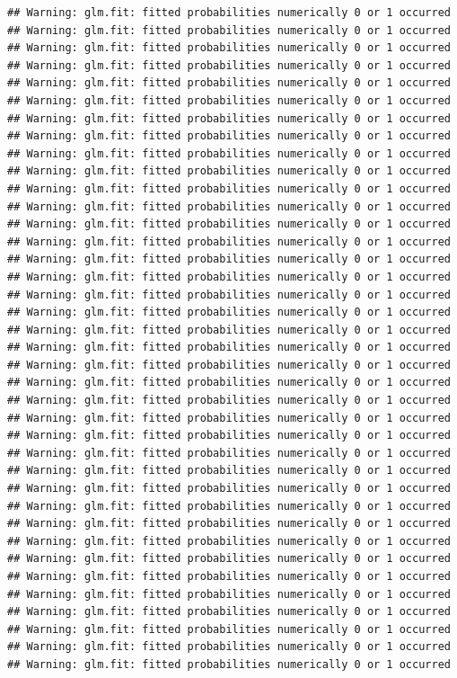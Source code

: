 \documentclass[
]{article}
\begin{document}
\begin{verbatim}
## Warning: glm.fit: fitted probabilities numerically 0 or 1 occurred
## Warning: glm.fit: fitted probabilities numerically 0 or 1 occurred
## Warning: glm.fit: fitted probabilities numerically 0 or 1 occurred
## Warning: glm.fit: fitted probabilities numerically 0 or 1 occurred
## Warning: glm.fit: fitted probabilities numerically 0 or 1 occurred
## Warning: glm.fit: fitted probabilities numerically 0 or 1 occurred
## Warning: glm.fit: fitted probabilities numerically 0 or 1 occurred
## Warning: glm.fit: fitted probabilities numerically 0 or 1 occurred
## Warning: glm.fit: fitted probabilities numerically 0 or 1 occurred
## Warning: glm.fit: fitted probabilities numerically 0 or 1 occurred
## Warning: glm.fit: fitted probabilities numerically 0 or 1 occurred
## Warning: glm.fit: fitted probabilities numerically 0 or 1 occurred
## Warning: glm.fit: fitted probabilities numerically 0 or 1 occurred
## Warning: glm.fit: fitted probabilities numerically 0 or 1 occurred
## Warning: glm.fit: fitted probabilities numerically 0 or 1 occurred
## Warning: glm.fit: fitted probabilities numerically 0 or 1 occurred
## Warning: glm.fit: fitted probabilities numerically 0 or 1 occurred
## Warning: glm.fit: fitted probabilities numerically 0 or 1 occurred
## Warning: glm.fit: fitted probabilities numerically 0 or 1 occurred
## Warning: glm.fit: fitted probabilities numerically 0 or 1 occurred
## Warning: glm.fit: fitted probabilities numerically 0 or 1 occurred
## Warning: glm.fit: fitted probabilities numerically 0 or 1 occurred
## Warning: glm.fit: fitted probabilities numerically 0 or 1 occurred
## Warning: glm.fit: fitted probabilities numerically 0 or 1 occurred
## Warning: glm.fit: fitted probabilities numerically 0 or 1 occurred
## Warning: glm.fit: fitted probabilities numerically 0 or 1 occurred
## Warning: glm.fit: fitted probabilities numerically 0 or 1 occurred
## Warning: glm.fit: fitted probabilities numerically 0 or 1 occurred
## Warning: glm.fit: fitted probabilities numerically 0 or 1 occurred
## Warning: glm.fit: fitted probabilities numerically 0 or 1 occurred
## Warning: glm.fit: fitted probabilities numerically 0 or 1 occurred
## Warning: glm.fit: fitted probabilities numerically 0 or 1 occurred
## Warning: glm.fit: fitted probabilities numerically 0 or 1 occurred
## Warning: glm.fit: fitted probabilities numerically 0 or 1 occurred
## Warning: glm.fit: fitted probabilities numerically 0 or 1 occurred
## Warning: glm.fit: fitted probabilities numerically 0 or 1 occurred
## Warning: glm.fit: fitted probabilities numerically 0 or 1 occurred
## Warning: glm.fit: fitted probabilities numerically 0 or 1 occurred

\end{verbatim}
\end{document}
